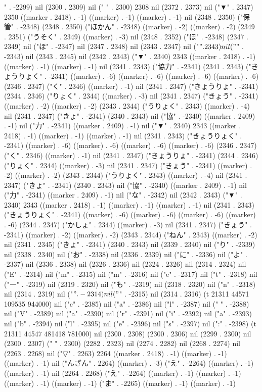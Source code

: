 " . -2299) nil (2300 . 2309) nil ("        " . 2300) 2308 nil (2372 . 2373) nil ("▼" . 2347) 2350 ((marker . 2418) . -1) ((marker) . -1) ((marker) . -1) nil (2348 . 2350) ("保管" . -2348) (2348 . 2350) ("ほかん" . -2348) ((marker) . -2) ((marker) . -2) (2349 . 2351) ("うそく" . 2349) ((marker) . -3) nil (2348 . 2352) ("ほ" . -2348) (2347 . 2349) nil ("ほ" . -2347) nil (2347 . 2348) nil (2343 . 2347) nil ("$" . 2343) nil ("$" . -2343) nil (2343 . 2345) nil (2342 . 2343) ("▼" . 2340) 2343 ((marker . 2418) . -1) ((marker) . -1) ((marker) . -1) nil (2341 . 2343) ("協力" . -2341) (2341 . 2343) ("きょうりょく" . -2341) ((marker) . -6) ((marker) . -6) ((marker) . -6) ((marker) . -6) (2346 . 2347) ("く" . 2346) ((marker) . -1) nil (2341 . 2347) ("きょうりょ" . -2341) (2344 . 2346) ("りょく" . 2344) ((marker) . -3) nil (2341 . 2347) ("きょう" . -2341) ((marker) . -2) ((marker) . -2) (2343 . 2344) ("うりょく" . 2343) ((marker) . -4) nil (2341 . 2347) ("きょ" . -2341) (2340 . 2343) nil ("協" . -2340) ((marker . 2409) . -1) nil ("力" . -2341) ((marker . 2409) . -1) nil ("▼" . 2340) 2343 ((marker . 2418) . -1) ((marker) . -1) ((marker) . -1) nil (2341 . 2343) ("きょうりょく" . -2341) ((marker) . -6) ((marker) . -6) ((marker) . -6) ((marker) . -6) (2346 . 2347) ("く" . 2346) ((marker) . -1) nil (2341 . 2347) ("きょうりょ" . -2341) (2344 . 2346) ("りょく" . 2344) ((marker) . -3) nil (2341 . 2347) ("きょう" . -2341) ((marker) . -2) ((marker) . -2) (2343 . 2344) ("うりょく" . 2343) ((marker) . -4) nil (2341 . 2347) ("きょ" . -2341) (2340 . 2343) nil ("協" . -2340) ((marker . 2409) . -1) nil ("力" . -2341) ((marker . 2409) . -1) nil ("な" . -2342) nil (2342 . 2343) ("▼" . 2340) 2343 ((marker . 2418) . -1) ((marker) . -1) ((marker) . -1) nil (2341 . 2343) ("きょうりょく" . -2341) ((marker) . -6) ((marker) . -6) ((marker) . -6) ((marker) . -6) (2344 . 2347) ("かしょ" . 2344) ((marker) . -3) nil (2341 . 2347) ("きょう" . -2341) ((marker) . -2) ((marker) . -2) (2343 . 2344) ("ねん" . 2343) ((marker) . -2) nil (2341 . 2345) ("きょ" . -2341) (2340 . 2343) nil (2339 . 2340) nil ("り" . -2339) nil (2338 . 2340) nil ("お" . -2338) nil (2336 . 2339) nil ("に" . -2336) nil ("よ" . -2337) nil (2336 . 2338) nil (2326 . 2336) nil (2324 . 2326) nil (2314 . 2324) nil ("E" . -2314) nil ("m" . -2315) nil ("m" . -2316) nil ("e" . -2317) nil ("t" . -2318) nil ("ー" . -2319) nil (2319 . 2320) nil ("も" . -2319) nil (2318 . 2320) nil ("n" . -2318) nil (2314 . 2319) nil ("$" . -2314) nil ("$" . -2315) nil (2314 . 2316) (t 21311 44571 109535 944000) nil ("c" . -2385) nil ("a" . -2386) nil ("l" . -2387) nil (" " . -2388) nil ("V" . -2389) nil ("a" . -2390) nil ("r" . -2391) nil ("i" . -2392) nil ("a" . -2393) nil ("b" . -2394) nil ("l" . -2395) nil ("e" . -2396) nil ("s" . -2397) nil (":" . -2398) (t 21311 44547 481418 781000) nil (2300 . 2308) (2300 . 2306) nil (2299 . 2300) nil (2300 . 2307) ("        " . 2300) (2282 . 2323) nil (2274 . 2282) nil (2268 . 2274) nil (2263 . 2268) nil ("▽" . 2263) 2264 ((marker . 2418) . -1) ((marker) . -1) ((marker) . -1) nil ("んざん" . 2264) ((marker) . -3) ("え" . -2264) ((marker) . -1) ((marker) . -1) nil (2264 . 2268) ("え" . -2264) ((marker) . -1) ((marker) . -1) ((marker) . -1) ((marker) . -1) ("ま" . -2265) ((marker) . -1) ((marker) . -1) 